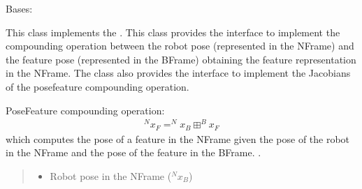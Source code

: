 \documentclass[letterpaper,10pt,english]{sphinxmanual}
\begin{document}
\begin{fulllineitems}
\label{\detokenize{Feature:Feature.Feature}}
\pysigstartsignatures
{}
\pysigstopsignatures
\sphinxAtStartPar
Bases: 

\sphinxAtStartPar
This class implements the . This class provides the interface
to implement the compounding operation between the robot pose (represented in the N\sphinxhyphen{}Frame) and the feature pose (represented in
the B\sphinxhyphen{}Frame) obtaining the feature representation in the N\sphinxhyphen{}Frame.
The class also provides the interface to implement the Jacobians of the pose\sphinxhyphen{}feature compounding operation.

\begin{fulllineitems}
\label{\detokenize{Feature:Feature.Feature.__init__}}
\pysigstartsignatures
{}
\pysigstopsignatures
\end{fulllineitems}


\begin{fulllineitems}
\label{\detokenize{Feature:Feature.Feature.boxplus}}
\pysigstartsignatures
{}
\pysigstopsignatures
\sphinxAtStartPar
Pose\sphinxhyphen{}Feature compounding operation:
\begin{equation}\label{equation:Feature:eq-boxplus}
\begin{split}^Nx_F=^Nx_B \boxplus ^Bx_F\end{split}
\end{equation}
\sphinxAtStartPar
which computes the pose of a feature in the N\sphinxhyphen{}Frame given the pose of the robot in the N\sphinxhyphen{}Frame and the pose of
the feature in the B\sphinxhyphen{}Frame.
.
\begin{quote}\begin{description}
\begin{itemize}
\item {} 
\sphinxAtStartPar
{} \textendash{} Robot pose in the N\sphinxhyphen{}Frame (\(^Nx_B\))


\end{itemize}
\end{description}
\end{quote}
\end{fulllineitems}
\end{fulllineitems}
\end{document}
